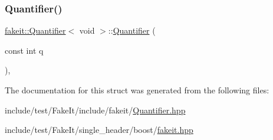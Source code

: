 \mbox{\label{structfakeit_1_1Quantifier_3_01void_01_4_aa43b73adf29aa234b3c15b66c9e985c0}} 
\subsubsection{\texorpdfstring{Quantifier()}{Quantifier()}\hspace{0.1cm}{\footnotesize\ttfamily [9/9]}}
{\footnotesize\ttfamily \mbox{\hyperlink{structfakeit_1_1Quantifier}{fakeit\+::\+Quantifier}}$<$ void $>$\+::\mbox{\hyperlink{structfakeit_1_1Quantifier}{Quantifier}} (\begin{DoxyParamCaption}\item[{const int}]{q }\end{DoxyParamCaption})\hspace{0.3cm}{\ttfamily [inline]}, {\ttfamily [explicit]}}



The documentation for this struct was generated from the following files\+:\begin{DoxyCompactItemize}
\item 
include/test/\+Fake\+It/include/fakeit/\mbox{\hyperlink{Quantifier_8hpp}{Quantifier.\+hpp}}\item 
include/test/\+Fake\+It/single\+\_\+header/boost/\mbox{\hyperlink{single__header_2boost_2fakeit_8hpp}{fakeit.\+hpp}}\end{DoxyCompactItemize}
